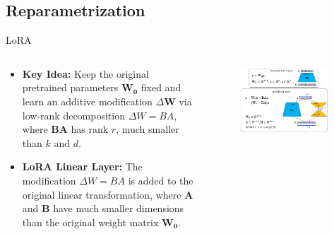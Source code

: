 \documentclass[serif, aspectratio=169]{beamer}
\begin{document}
\subsection{Reparametrization}
\begin{frame}{LoRA}
    \begin{columns}

        \begin{column}{0.5\textwidth}
            \begin{itemize}
                \item  
                    \textbf{Key Idea:} Keep the original pretrained parameters \( \boldsymbol{W_0} \) fixed and learn an additive modification \( \Delta \boldsymbol{W} \) via low-rank decomposition \( \Delta W = BA \), where \( \boldsymbol{BA} \) has rank \( r \), much smaller than \( k \) and \( d \).

                \item  
                    \textbf{LoRA Linear Layer:} The modification \( \Delta W = BA \) is added to the original linear transformation, where \( \boldsymbol{A} \) and \( \boldsymbol{B} \) have much smaller dimensions than the original weight matrix \( \boldsymbol{W_0} \).
            \end{itemize}
        \end{column}

        \begin{column}{0.5\textwidth}
            \begin{figure}
            \centering
            \includegraphics[width=0.95\textwidth]{pic/LoRA.jpg}
            \end{figure}
        \end{column}

    \end{columns}
\end{frame}
\end{document}
